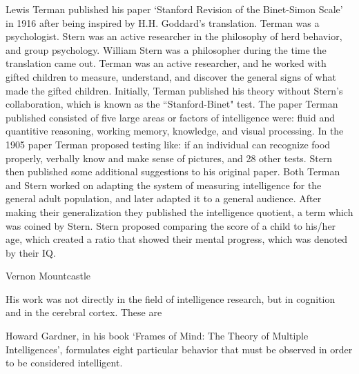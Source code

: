 \documentclass[12pt, oneside]{article}
\begin{document}
\par Lewis Terman published his paper `Stanford Revision of the Binet-Simon Scale' in 1916 after being inspired by H.H. Goddard's translation. Terman was a psychologist. Stern was an active researcher in the philosophy of herd behavior, and group psychology. William Stern was a philosopher during the time the translation came out. Terman was an active researcher, and he worked with gifted children to measure, understand, and discover the general signs of what made the gifted children. Initially, Terman published his theory without Stern's collaboration, which is known as the ``Stanford-Binet" test. The paper Terman published consisted of five large areas or factors of intelligence were: fluid and quantitive reasoning, working memory, knowledge, and visual processing. In the 1905 paper Terman proposed testing like: if an individual can recognize food properly, verbally know and make sense of pictures, and 28 other tests. Stern then published some additional suggestions to his original paper. Both Terman and Stern worked on adapting the system of measuring intelligence for the general adult population, and later adapted it to a general audience. After making their generalization they published the intelligence quotient, a term which was coined by Stern. Stern proposed comparing the score of a child to his/her age, which created a ratio that showed their mental progress, which was denoted by their IQ. 

\par 


\par Vernon Mountcastle 
\par His work was not directly in the field of intelligence research, but in cognition and in the cerebral cortex. These are 


\par Howard Gardner, in his book `Frames of Mind: The Theory of Multiple Intelligences', formulates eight particular behavior that must be observed in order to be considered intelligent. 
\end{document}
